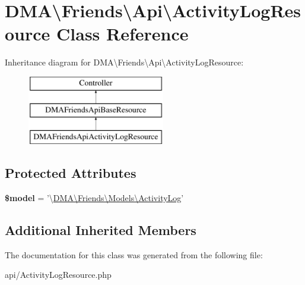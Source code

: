 \hypertarget{classDMA_1_1Friends_1_1Api_1_1ActivityLogResource}{\section{D\-M\-A\textbackslash{}Friends\textbackslash{}Api\textbackslash{}Activity\-Log\-Resource Class Reference}
\label{classDMA_1_1Friends_1_1Api_1_1ActivityLogResource}
}
Inheritance diagram for D\-M\-A\textbackslash{}Friends\textbackslash{}Api\textbackslash{}Activity\-Log\-Resource\-:\begin{figure}[H]
\begin{center}
\leavevmode
\includegraphics[height=3.000000cm]{d2/de6/classDMA_1_1Friends_1_1Api_1_1ActivityLogResource}
\end{center}
\end{figure}
\subsection*{Protected Attributes}
\begin{DoxyCompactItemize}
\item 
\hypertarget{classDMA_1_1Friends_1_1Api_1_1ActivityLogResource_abc7fd905609e3135075185ce7af02e43}{{\bfseries \$model} = '\textbackslash{}\hyperlink{classDMA_1_1Friends_1_1Models_1_1ActivityLog}{D\-M\-A\textbackslash{}\-Friends\textbackslash{}\-Models\textbackslash{}\-Activity\-Log}'}\label{classDMA_1_1Friends_1_1Api_1_1ActivityLogResource_abc7fd905609e3135075185ce7af02e43}

\end{DoxyCompactItemize}
\subsection*{Additional Inherited Members}


The documentation for this class was generated from the following file\-:\begin{DoxyCompactItemize}
\item 
api/Activity\-Log\-Resource.\-php\end{DoxyCompactItemize}
